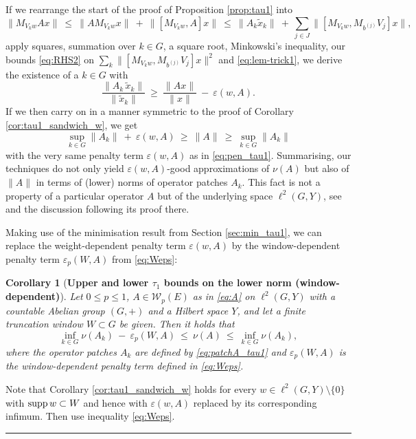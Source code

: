 \documentclass{article}
\newcommand\W{{\mathcal W}}
\newcommand\eps{{\varepsilon}}
\newcommand\supp{{\rm supp\,}}
\newtheorem{corollary}[theorem]{Corollary}
\newenvironment{remark}
 {\par\noindent\refstepcounter{theorem}{\bf Remark \thetheorem\ }}
 {\raisebox{1mm}{\framebox{}}\par\pagebreak[2]}
\newcommand\Proofend{\rule{2mm}{2mm}}
\renewenvironment{proof}
 {\par\noindent{\bf Proof.}}
 {\Proofend\par\pagebreak[2]}
\numberwithin{equation}{section}   %
\numberwithin{figure}{section}  %
\begin{document}
\begin{remark}
If we rearrange the start of the proof of Proposition \ref{prop:tau1} into
\[
\|M_{V_kw}Ax\|\ \le\ \|AM_{V_kw}x\| \ +\ \|[M_{V_kw},A]x\|\ \le\ \|A_k\tilde x_k\| \ +\ \sum_{j\in J}\|[M_{V_kw},M_{b^{(j)}}V_j]x\|,
\]
apply squares, summation over $k\in G$, a square root, Minkowski's inequality, our bounds \eqref{eq:RHS2} on $\sum_k\|[M_{V_kw},M_{b^{(j)}}V_j]x\|^2$ and \eqref{eq:lem-trick1}, we derive the existence of a $k\in G$ with
\[
\frac{\|A_{k}\, \tilde x_{k}\|}{\| \tilde x_{k}\|}\ \ge\ \frac{\|Ax\|}{\|x\|}\ -\ \eps(w,A).
\]
If we then carry on in a manner symmetric to the proof of Corollary \ref{cor:tau1_sandwich_w}, we get
\[
\sup_{k\in G}\|A_k\|\ +\ \eps(w,A)\ \ge\ \|A\|\ \ge\ \sup_{k\in G}\|A_k\|
\]
with the very same penalty term $\eps(w,A)$ as in \eqref{eq:pen_tau1}.
Summarising, our techniques do not only yield $\eps(w,A)$-good approximations of $\nu(A)$ but also of $\|A\|$ in terms of (lower) norms of operator patches $A_k$. This fact is not a property of a particular operator $A$ but of the underlying space $\ell^2(G,Y)$, see \cite[Prop.~3.4]{HagLiSei} and the discussion following its proof there.
\end{remark}

Making use of the minimisation result from Section \ref{sec:min_tau1}, we can replace the weight-dependent penalty term $\eps(w,A)$ by the window-dependent penalty term $\eps_p(W,A)$ from \eqref{eq:Weps}:

\begin{corollary}[\bf Upper and lower $\tau_1$ bounds on the lower norm (window-dependent)] \label{cor:tau1_sandwich_W}
Let $0\leq p\leq 1$, $A\in \W_p(E)$ as in \eqref{eq:A} on $\ell^2(G,Y)$ with a countable Abelian group $(G,+)$ and a Hilbert space $Y$, and
let a finite truncation window $W\subset G$ be given. Then it holds that
\begin{equation} \label{eq:sandw_nuA}
\inf_{k\in G}\nu(A_k)\ -\ \eps_p(W,A)\ \le\ \nu(A)\ \le\ \inf_{k\in G}\nu(A_k),
\end{equation}
where the operator patches $A_k$ are defined by \eqref{eq:patchA_tau1} and $\eps_p(W,A)$ is the window-dependent penalty term defined in \eqref{eq:Weps}.
\end{corollary}
\begin{proof}
Note that Corollary \ref{cor:tau1_sandwich_w} holds for every $w\in\ell^2(G,Y)\setminus\{0\}$ with $\supp w\subset W$ and hence with $\eps(w,A)$ replaced by its corresponding infimum. Then use inequality \eqref{eq:Weps}.
\end{proof}
\end{document}
